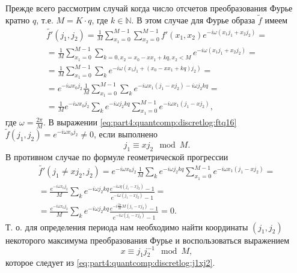 Прежде всего рассмотрим случай когда число отсчетов преобразования
Фурье кратно $q$, т.е. $M = K \cdot q$, где $k \in \mathbb{N}$. В этом
случае для Фурье образа $\tilde{f}$ имеем 
\begin{eqnarray}
\tilde{f'}\left(j_1, j_2\right) = 
\frac{1}{M}\sum_{x_1 = 0}^{M-1}\sum_{x_2 = 0}^{M-1} 
f'\left(x_1, x_2\right)e^{-i \omega\left(x_1 j_1 + x_2j_2\right)} =
\nonumber \\
= \frac{1}{M}\sum_{x_1 = 0}^{M-1} 
\sum_{k=0, x_2 = x_0 - x x_1 + k q, x_2 < M}
e^{-i \omega\left(x_1 j_1 + x_2 j_2\right)} = 
\nonumber \\
=
 \frac{1}{M}\sum_{x_1 = 0}^{M-1}\sum_{k}
e^{-i \omega\left(x_1 j_1 + (x_0 - x
   x_1 + kq) j_2\right)} = 
\nonumber \\
= e^{-i \omega x_0 j_2}\frac{1}{M}\sum_{x_1 = 0}^{M-1}
\sum_{k}
e^{-i  \omega x_1 \left(j_1 - x j_2\right) -i \omega j_2 k q} =
\nonumber \\
= 
\frac{1}{M} e^{-i \omega x_0 j_2} \sum_k e^{-i \omega j_2 k q}  
\sum_{x_1 = 0}^{M-1} e^{-i  \omega x_1 \left(j_1 - x j_2\right)},
\label{eq:part4:quantcomp:discretlog:ftq16}
\end{eqnarray}
где $\omega = \frac{2 \pi}{M}$. В выражении
\eqref{eq:part4:quantcomp:discretlog:ftq16} $\tilde{f}(j_1, j_2) =
e^{-i \omega x_0 j_2} \ne 0$, если выполнено 
\begin{equation}
j_1 \equiv x j_2 \mod M.
\label{eq:part4:quantcomp:discretlog:j1xj2}
\end{equation} 
В противном случае по формуле геометрической прогрессии 
\begin{eqnarray}
\tilde{f'}\left(j_1 \ne x j_2, j_2\right) = 
e^{-i \omega x_0 j_2}\frac{1}{M}\sum_k e^{-i \omega j_2 k q} 
\sum_{x_1 = 0}^{M-1}e^{-i
  \omega x_1 \left(j_1 - x j_2\right)} = 
\nonumber \\
=
\frac{e^{-i \omega x_0 j_2}}{M} \sum_k e^{-i \omega j_2 k q} \frac{e^{-i
  \omega q \left(j_1 - x j_2\right)} - 1}{e^{-i
  \omega \left(j_1 - x j_2\right)} - 1} = 
\nonumber \\
=
 \frac{e^{-i \omega x_0 j_2}}{M} 
\sum_k e^{-i \omega j_2 k q}
\frac{e^{-i \frac{2 \pi}{M} M \left(j_1 - x j_2\right)} - 1}{e^{-i
  \omega \left(j_1 - x j_2\right)} - 1} = 0.
\nonumber
\end{eqnarray} 
Т. о. для определения периода нам необходимо найти координаты $(j_1, j_2)$
некоторого максимума преобразования Фурье и воспользоваться выражением 
\begin{equation}
x \equiv j_1 j_2^{-1} \mod M,
\label{eq:part4:quantcomp:discretlog:periodfourier}
\end{equation}
которое следует из \eqref{eq:part4:quantcomp:discretlog:j1xj2}.

